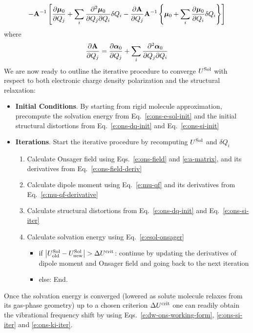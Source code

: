 \documentclass[a4paper,titlepage,twoside,fleqn,12pt]{book}
\newcommand{\BM}[1]{\bm{#1}}
\newcommand{\fderiv}[2]{\ensuremath{
\frac{\partial #1}{\partial #2}}}
\newcommand{\sderivd}[3]{\ensuremath{
\frac{\partial^2 #1}{\partial #2 \partial #3}
}}
\begin{document}
\begin{refsection}
\begin{equation}
- {\bf A}^{-1} 
   \left[ 
       \fderiv{{\BM \mu}_0}{Q_j} 
      + \sum_i \sderivd{{\BM \mu}_0}{Q_j}{Q_i} \delta Q_i 
      - \fderiv{{\bf A}}{Q_j}  {\bf A}^{-1}  
           \left\{ 
               {\BM \mu}_0 + \sum_i \fderiv{{\BM \mu}_0}{Q_i}\delta Q_i
           \right\}
   \right]
\end{equation}
%
where
%
\begin{equation}
  \fderiv{{\bf A}}{Q_j} = \fderiv{{\BM \alpha}_0}{Q_j} 
               + \sum_i \sderivd{{\BM \alpha}_0}{Q_j}{Q_i}
\end{equation}
%
We are now ready to outline the iterative procedure
to converge $U^{\rm Sol}$ with respect to both electronic
charge density polarization and the structural
relaxation:
%
\begin{itemize}
\item[\textbullet] {\bf Initial Conditions}. 
                        By starting from rigid molecule approximation,
                        precompute the solvation energy from Eq.~\eqref{e:ons-e-sol-init}
                        and the initial structural distortions
                        from Eq.~\eqref{e:ons-dq-init} and 
                        Eq.~\eqref{e:ons-si-init}
\item[\textbullet] {\bf Iterations}. Start the iterative procedure 
                        by recomputing $U^{\rm Sol}$ and $\delta Q_i$
\begin{enumerate}
 \item Calculate Onsager field using Eqs.~\eqref{e:ons-field} and \eqref{e:a-matrix}, 
       and its derivatives from Eq.~\eqref{e:ons-field-deriv}
 \item Calculate dipole moment using Eq.~\eqref{e:mu-qf} 
       and its derivatives from Eq.~\eqref{e:mu-qf-derivative}
 \item Calculate structural distortions from Eq.~\eqref{e:ons-dq-init}
       and Eq.~\eqref{e:ons-si-iter}
 \item Calculate solvation energy using Eq.~\eqref{e:esol-onsager}
 \begin{itemize}
      \item if $\left| U^{\rm Sol}_{\rm old} - U^{\rm Sol}_{\rm new}\right| > \Delta U^{\rm crit}$:
            continue by updating the derivatives of dipole moment and Onsager field
            and going back to the next iteration
      \item else: End. 
 \end{itemize}    
\end{enumerate}
\end{itemize}
%
Once the solvation energy is converged 
(lowered as solute molecule
relaxes from its gas\hyp{}phase geometry) 
up to a chosen criterion $\Delta U^{\rm crit}$
one can readily obtain
the vibrational frequency shift by using Eqs.~\eqref{e:dw-ons-working-form},
\eqref{e:ons-si-iter} and \eqref{e:ons-ki-iter}.


\end{refsection}
\end{document}
